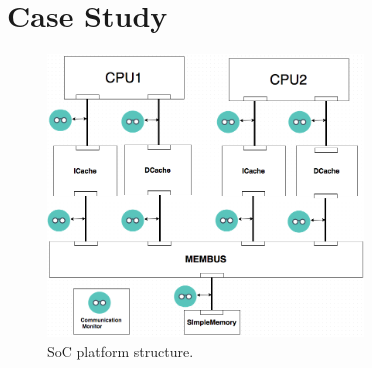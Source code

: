 \documentclass[conference]{IEEEtran}
\begin{document}


  
%



%
%
\section{Case Study}



\begin{figure} 
\centerline{
\includegraphics[width=3.3in]{figures/Fig4.png}}
\caption{SoC platform structure.}
\label{SoC}
\end{figure}
\end{document}
